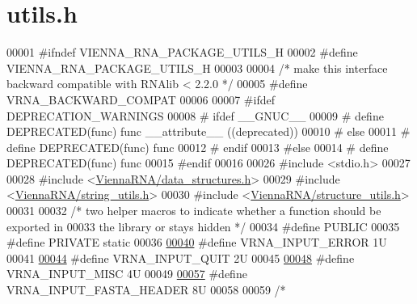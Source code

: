 \hypertarget{utils_8h_source}{\section{utils.\+h}
\label{utils_8h_source}
}

\begin{DoxyCode}
00001 \textcolor{preprocessor}{#ifndef VIENNA\_RNA\_PACKAGE\_UTILS\_H}
00002 \textcolor{preprocessor}{#define VIENNA\_RNA\_PACKAGE\_UTILS\_H}
00003 
00004 \textcolor{comment}{/* make this interface backward compatible with RNAlib < 2.2.0 */}
00005 \textcolor{preprocessor}{#define VRNA\_BACKWARD\_COMPAT}
00006 
00007 \textcolor{preprocessor}{#ifdef DEPRECATION\_WARNINGS}
00008 \textcolor{preprocessor}{# ifdef \_\_GNUC\_\_}
00009 \textcolor{preprocessor}{#  define DEPRECATED(func) func \_\_attribute\_\_ ((deprecated))}
00010 \textcolor{preprocessor}{# else}
00011 \textcolor{preprocessor}{#  define DEPRECATED(func) func}
00012 \textcolor{preprocessor}{# endif}
00013 \textcolor{preprocessor}{#else}
00014 \textcolor{preprocessor}{# define DEPRECATED(func) func}
00015 \textcolor{preprocessor}{#endif}
00016 
00026 \textcolor{preprocessor}{#include <stdio.h>}
00027 
00028 \textcolor{preprocessor}{#include <\hyperlink{data__structures_8h}{ViennaRNA/data\_structures.h}>}
00029 \textcolor{preprocessor}{#include <\hyperlink{string__utils_8h}{ViennaRNA/string\_utils.h}>}
00030 \textcolor{preprocessor}{#include <\hyperlink{structure__utils_8h}{ViennaRNA/structure\_utils.h}>}
00031 
00032 \textcolor{comment}{/* two helper macros to indicate whether a function should be exported in}
00033 \textcolor{comment}{the library or stays hidden */}
00034 \textcolor{preprocessor}{#define PUBLIC}
00035 \textcolor{preprocessor}{#define PRIVATE static}
00036 
\hypertarget{utils_8h_source_l00040}{}\hyperlink{group__utils_gad403c9ea58f1836689404c2931419c8c}{00040} \textcolor{preprocessor}{#define VRNA\_INPUT\_ERROR                  1U}
00041 
\hypertarget{utils_8h_source_l00044}{}\hyperlink{group__utils_ga72f3c6ca5c83d2b9baed2922d19c403d}{00044} \textcolor{preprocessor}{#define VRNA\_INPUT\_QUIT                   2U}
00045 
\hypertarget{utils_8h_source_l00048}{}\hyperlink{group__utils_ga8e3241b321c9c1a78a69e59e2e019a71}{00048} \textcolor{preprocessor}{#define VRNA\_INPUT\_MISC                   4U}
00049 
\hypertarget{utils_8h_source_l00057}{}\hyperlink{group__utils_ga2f0d8069e93d3ac54d9320d6bdb8e7e7}{00057} \textcolor{preprocessor}{#define VRNA\_INPUT\_FASTA\_HEADER           8U}
00058 
00059 \textcolor{comment}{/*}

\end{DoxyCode}
